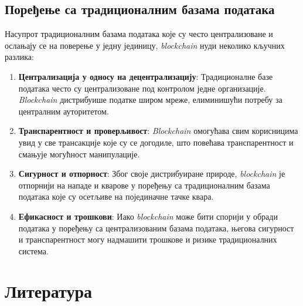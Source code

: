 \documentclass[12pt, a4paper]{article}
\begin{document}
\subsection{Поређење са традиционалним базама података}
Насупрот традиционалним базама података које су често централизоване и ослањају се на поверење у једну јединицу, \textit{blockchain} нуди неколико кључних разлика:
\begin{enumerate}
    \item \textbf{Централизација у односу на децентрализацију}: Традиционалне базе података често су централизоване под контролом једне организације. \textit{Blockchain} дистрибуише податке широм мреже, елиминишући потребу за централним ауторитетом.
    \item \textbf{Транспарентност и проверљивост}: \textit{Blockchain} омогућава свим корисницима увид у све трансакције које су се догодиле, што повећава транспарентност и смањује могућност манипулације.
    \item \textbf{Сигурност и отпорност}: Због своје дистрибуиране природе, \textit{blockchain} је отпорнији на нападе и кварове у поређењу са традиционалним базама података које су осетљиве на појединачне тачке квара.
    \item \textbf{Ефикасност и трошкови}: Иако \textit{blockchain} може бити спорији у обради података у поређењу са централизованим базама података, његова сигурност и транспарентност могу надмашити трошкове и ризике традиционалних система.
\end{enumerate}










\pagebreak

\section{Литература}
\renewcommand{\refname}{}
\vspace{-\parskip} %
\vspace{-\parskip} %
\vspace{-\parskip} %
\vspace{-\parskip} %

\end{document}
